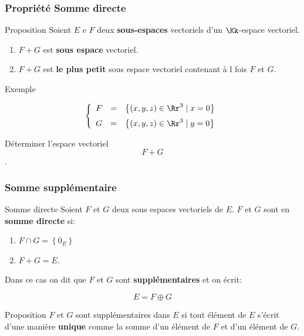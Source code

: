 \documentclass[dvipsnames]{beamer}
\begin{document}
\begin{frame}[<+->]
  \frametitle{Propriété Somme directe}
 \begin{block}{Proposition}
   Soient $E$ e $F$ deux \textbf{sous-espaces} vectoriels  d'un $\Kk$-espace
   vectoriel.\\[8pt]

   \begin{enumerate}
     \small
     \item  $F + G$ est \textbf{\alert{sous espace}} vectoriel.\\[6pt] 
     \item  $F + G$ est \textbf{\alert{ le plus petit}} sous espace vectoriel
       contenant à l fois $F$ et $G$. 
   \end{enumerate}
 \end{block} 

 \begin{block}{Exemple}
   \small

   \begin{equation*}
     \left\{\begin{array}{lll}
         F &=& \left\{(x,y,z)\in\Rr^3 \;|\; x=0\right\}\\[6pt]
         G &=& \left\{(x,y,z)\in\Rr^3 \;|\; y=0\right\}
     \end{array}\right.
   \end{equation*}

   Déterminer l'espace vectoriel $$F+ G$$.
 \end{block}
\end{frame}
\begin{frame}[t]
  \frametitle{Somme supplémentaire}
 \begin{block}{Somme directe}
   \small
  Soient $F$ et $G$ deux sous espaces vectoriels de $E$. $F$ et $G$ sont en
  \textbf{\alert{somme directe}} si:

  \begin{enumerate}
    \item $F\cap G = \left\{0_E\right\}$\\[4pt]
    \item $F + G = E$.
  \end{enumerate}
  Dans ce cas on dit que $F$ et $G$ sont \textbf{\alert{supplémentaires}} et on
  écrit:

\begin{equation}
  E = F \oplus G
\end{equation}
 \end{block} 

 \begin{block}{Proposition}
   \small
  $F$ et $G$ sont supplémentaires dans $E$ si tout élément de $E$ s'écrit
  d'une manière \textbf{\alert{unique}} comme la somme d'un élément de $F$
  et d'un élément de $G$.

 \end{block}
\end{frame}
\end{document}
